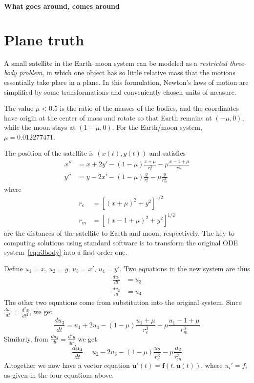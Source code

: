 \documentclass[11pt,twoside]{article}
\begin{document}
\begin{center}
  \Large
  \bf What goes around, comes around
\end{center}

\section{Plane truth}

A small satellite in the Earth--moon system can be modeled as a \emph{restricted three-body problem}, in which one object has so little relative mass that the motions essentially take place in a plane. In this formulation, Newton's laws of motion are simplified by some transformations and conveniently chosen units of measure. 

The value $\mu<0.5$ is the ratio of the masses of the bodies, and the coordinates have origin at the center of mass and rotate so that Earth remains at $(-\mu,0)$, while the moon stays at $(1-\mu,0)$. For the Earth/moon system, $\mu=0.012277471$.

The position of the satellite is $(x(t),y(t))$ and satisfies
\begin{equation}
  \label{eq:r3body}
\begin{split}
  x'' &= x + 2y' - (1-\mu) \frac{x+\mu}{r_e^3} - \mu \frac{x-1+\mu}{r_m^3} \\
  y'' &= y - 2x' - (1-\mu) \frac{y}{r_e^3} - \mu \frac{y}{r_m^3} 
\end{split}
\end{equation}
where
\begin{equation}
  \label{eq:rrstar}
  \begin{split}
  r_e &= \left[ (x+\mu)^2 + y^2 \right]^{1/2} \\
  r_m &= \left[ (x-1+\mu)^2 + y^2 \right]^{1/2}
  \end{split}
\end{equation}
are the distances of the satellite to Earth and moon, respectively. The key to computing solutions using standard software is to transform the original ODE system~\eqref{eq:r3body} into a first-order one. 

Define $u_1=x$, $u_2=y$, $u_3=x'$, $u_4=y'$. Two equations in the new system are thus 
\begin{align}
  \frac{du_1}{dt} &= u_3  \label{eq:tb1} \\
  \frac{du_2}{dt} &= u_4  \label{eq:tb2}
\end{align}
The other two equations come from substitution into the original system. Since $\frac{du_3}{dt}=\frac{d^2x}{dt^2}$, we get
\begin{equation}
  \label{eq:tb3}
  \frac{du_3}{dt} = u_1 + 2u_4 - (1-\mu) \frac{u_1+\mu}{r_e^3} - \mu \frac{u_1-1+\mu}{r_m^3}
\end{equation}
Similarly, from $\frac{du_4}{dt}=\frac{d^2y}{dt^2}$ we get
\begin{equation}
  \label{eq:tb4}
  \frac{du_4}{dt} = u_2 - 2u_3 - (1-\mu) \frac{u_2}{r_e^3} - \mu \frac{u_2}{r_m^3}
\end{equation}
Altogether we now have a vector equation $\bm{u}'(t) = \bm{f}(t,\bm{u}(t))$, where $u_i'=f_i$ as given in the four equations above. 
\end{document}
